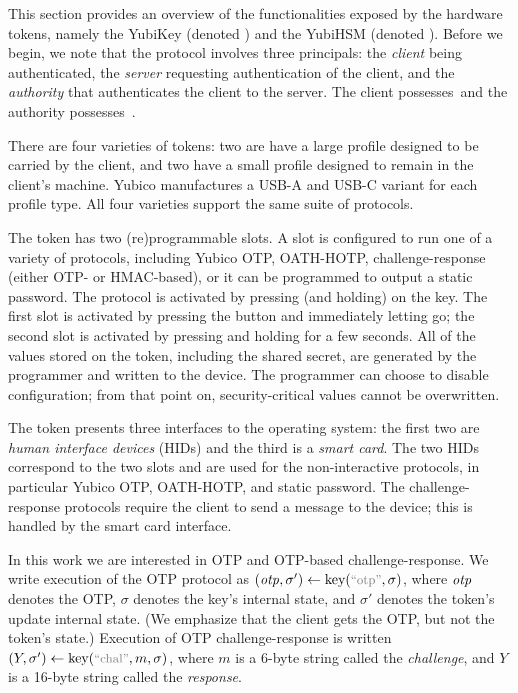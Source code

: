 \label{sec:tokens}
This section provides an overview of the functionalities exposed by the hardware
tokens, namely the YubiKey (denoted \key) and the YubiHSM (denoted \hsm).
%
Before we begin, we note that the protocol involves three principals: the
\emph{client} being authenticated, the \emph{server} requesting
authentication of the client, and the \emph{authority} that authenticates the
client to the server. The client possesses~\key and the authority possesses~\hsm.

%
There are four varieties of tokens: two are have a large profile designed to be
carried by the client, and two have a small profile designed to remain in the
client's machine. Yubico manufactures a USB-A and USB-C variant for each profile
type.
%
All four varieties support the same suite of protocols.

The token has two (re)programmable slots. A slot is configured to run one of a
variety of protocols, including Yubico OTP, OATH-HOTP, challenge-response
(either OTP- or HMAC-based), or it can be programmed to output a static
password. The protocol is activated by pressing (and holding) on the key. The
first slot is activated by pressing the button and immediately letting go; the
second slot is activated by pressing and holding for a few seconds.
%
All of the values stored on the token, including the shared secret, are
generated by the programmer and written to the device. The programmer can choose
to disable configuration; from that point on, security-critical values cannot be
overwritten.
%

The token presents three interfaces to the operating system: the first two are
\emph{human interface devices} (HIDs) and the third is a \emph{smart card}. The
two HIDs correspond to the two slots and are used for the non-interactive
protocols, in particular Yubico OTP, OATH-HOTP, and static password. The
challenge-response protocols require the client to send a message to the device;
this is handled by the smart card interface.
%

In this work we are interested in OTP and OTP-based challenge-response.
We write execution of the OTP protocol as $(\otp, \sigma') \gets
\key(\stringer{otp}, \sigma)$, where $\mathit{otp}$ denotes the OTP, $\sigma$ denotes
the key's internal state, and $\sigma'$ denotes the token's update internal
state. (We emphasize that the client gets the OTP, but not the token's state.)
%
Execution of OTP challenge-response is written $(Y, \sigma') \gets
\key(\stringer{chal}, m, \sigma)$, where $m$ is a 6-byte string called the
\emph{challenge}, and $Y$ is a 16-byte string called the \emph{response}.

